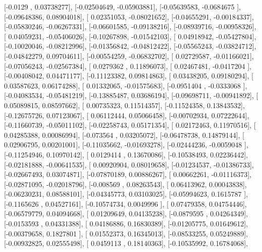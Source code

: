 \documentclass{article}
\begin{document}
       [-0.0129    ,  0.03738277],
       [-0.02504649, -0.05903881],
       [-0.05639583, -0.0684675 ],
       [-0.09648386,  0.08904018],
       [ 0.02351053, -0.08021652],
       [-0.04655291, -0.00184337],
       [-0.05830246, -0.06267331],
       [-0.06601585, -0.09138216],
       [-0.08939716, -0.00958326],
       [ 0.04059231, -0.05406026],
       [-0.10267898, -0.01542103],
       [ 0.04918942, -0.05427804],
       [-0.10020046, -0.08212996],
       [-0.01356842, -0.04812422],
       [-0.05565243, -0.03824712],
       [-0.04842279,  0.09704611],
       [-0.00554259, -0.06832702],
       [ 0.02729587, -0.01166021],
       [-0.07056243, -0.02567384],
       [ 0.0279362 ,  0.11896073],
       [ 0.02467481, -0.0417204 ],
       [-0.00408042,  0.04471177],
       [-0.11123382,  0.09814863],
       [ 0.03438205,  0.09180294],
       [ 0.03587623,  0.06174288],
       [ 0.01332065, -0.01575683],
       [-0.0951404 , -0.0333068 ],
       [-0.04083534, -0.05481219],
       [-0.13885487,  0.03686194],
       [-0.09698711, -0.00941892],
       [ 0.05089815,  0.08597662],
       [ 0.00735323,  0.11514357],
       [-0.11524358,  0.13843532],
       [-0.12675726,  0.07123067],
       [ 0.06112444,  0.05066458],
       [-0.00702934,  0.07222644],
       [-0.11660739, -0.05011102],
       [-0.02258743,  0.05171354],
       [ 0.02172463,  0.11970516],
       [ 0.04285388,  0.00086994],
       [-0.073564  ,  0.03205072],
       [-0.06478738,  0.14879144],
       [ 0.02906795,  0.00201001],
       [-0.11035662, -0.01693278],
       [-0.02444236, -0.0059048 ],
       [-0.11254946,  0.10970142],
       [ 0.0129414 ,  0.13670086],
       [-0.10538493,  0.02236442],
       [-0.02181888, -0.00641535],
       [ 0.00920904,  0.08019658],
       [-0.01234537, -0.01386733],
       [-0.02667493,  0.03074871],
       [-0.07870189,  0.00886267],
       [ 0.00662261, -0.01116373],
       [-0.02871095, -0.02018796],
       [-0.008569  ,  0.08263543],
       [ 0.06413962,  0.00043838],
       [-0.06230231,  0.08588101],
       [-0.04345773,  0.03103025],
       [-0.05994623,  0.1615787 ],
       [-0.1165626 ,  0.04527161],
       [-0.10574734,  0.0049996 ],
       [ 0.07479358,  0.04754446],
       [-0.06579779,  0.04094668],
       [ 0.01209649,  0.04135238],
       [-0.0879595 ,  0.04264349],
       [-0.0153593 ,  0.04331388],
       [ 0.04186886,  0.16830389],
       [-0.01205775,  0.01649612],
       [-0.00379658,  0.1827801 ],
       [ 0.01552373,  0.16345013],
       [-0.08533255,  0.05249889],
       [-0.00932825,  0.02555498],
       [ 0.0459113 ,  0.18140363],
       [-0.10535992,  0.16784068],
\end{document}
